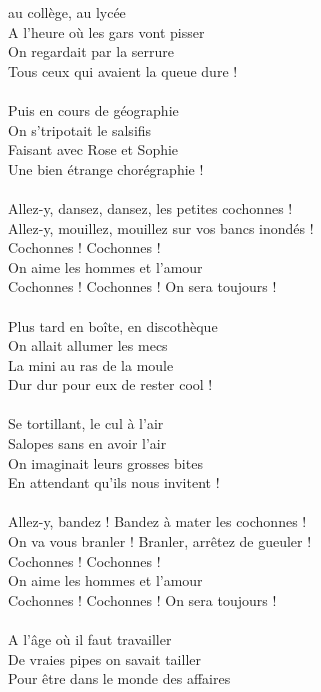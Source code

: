 
 au collège, au lycée
\\A l'heure où les gars vont pisser
\\On regardait par la serrure
\\Tous ceux qui avaient la queue dure !
\\\\Puis en cours de géographie
\\On s'tripotait le salsifis
\\Faisant avec Rose et Sophie
\\Une bien étrange chorégraphie !
\\\\Allez-y, dansez, dansez, les petites cochonnes !
\\Allez-y, mouillez, mouillez sur vos bancs inondés !
\\Cochonnes ! Cochonnes !
\\On aime les hommes et l'amour
\\Cochonnes ! Cochonnes ! On sera toujours !
\\\\Plus tard en boîte, en discothèque
\\On allait allumer les mecs
\\La mini au ras de la moule
\\Dur dur pour eux de rester cool !
\\\\Se tortillant, le cul à l'air
\\Salopes sans en avoir l'air
\\On imaginait leurs grosses bites
\\En attendant qu'ils nous invitent !
\\\\Allez-y, bandez ! Bandez à mater les cochonnes !
\\On va vous branler ! Branler, arrêtez de gueuler !
\\Cochonnes ! Cochonnes !
\\On aime les hommes et l'amour
\\Cochonnes ! Cochonnes ! On sera toujours !
\\\\A l'âge où il faut travailler
\\De vraies pipes on savait tailler
\\Pour être dans le monde des affaires
